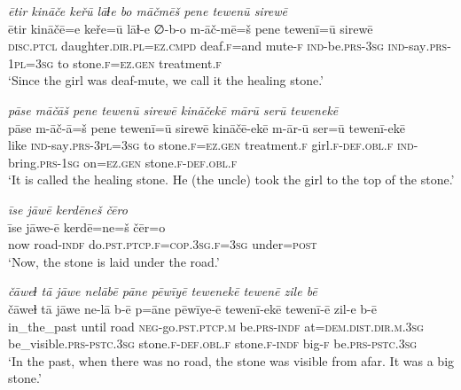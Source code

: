 \ea \label{ZP.51}
\textit{ētir kināče keřū lāɫe bo māčmēš pene tewenū sirewē} \\ 
\gll ētir kināčē=e keře=ū lāɫ-e ∅-b-o m-āč-mē=š pene tewenī=ū sirewē \\ 
 \textsc{disc.ptcl} daughter\textsc{.dir}\textsc{.pl}\textsc{=ez}\textsc{.cmpd} deaf\textsc{.f}=and mute\textsc{-f} \textsc{ind-}be\textsc{.prs}\textsc{-3sg} \textsc{ind-}say\textsc{.prs}\textsc{-1pl}\textsc{=3sg} to stone\textsc{.f}\textsc{\textsc{=ez.gen}} treatment\textsc{.f} \\ 
\glt `Since the girl was deaf-mute, we call it the healing stone.'
\z 
 
\ea \label{ZP.52}
\textit{pāse māčāš pene tewenū sirewē kināčekē mārū serū tewenekē} \\ 
\gll pāse m-āč-ā=š pene tewenī=ū sirewē kināčē-ekē m-ār-ū ser=ū tewenī-ekē \\ 
 like \textsc{ind-}say\textsc{.prs}\textsc{-3pl}\textsc{=3sg} to stone\textsc{.f}\textsc{\textsc{=ez.gen}} treatment\textsc{.f} girl\textsc{.f}\textsc{-def}\textsc{.obl}\textsc{.f} \textsc{ind-}bring\textsc{.prs}\textsc{-\textsc{1sg}} on\textsc{\textsc{=ez.gen}} stone\textsc{.f}\textsc{-def}\textsc{.obl}\textsc{.f} \\ 
\glt `It is called the healing stone. He (the uncle) took the girl to the top of the stone.'
\z 
 
\ea \label{ZP.53}
\textit{īse jāwē kerdēneš čēro} \\ 
\gll īse jāwe-ē kerdē=ne=š čēr=o \\ 
 now road\textsc{-indf} do\textsc{.pst}\textsc{.ptcp}\textsc{.f}\textsc{=cop}\textsc{.3sg}\textsc{.f}\textsc{=3sg} under\textsc{=\textsc{post}} \\ 
\glt `Now, the stone is laid under the road.'
\z 
 
\ea \label{ZP.54}
\textit{čāweɫ tā jāwe nelābē pāne pēwīyē tewenekē tewenē zile bē} \\ 
\gll čāweɫ tā jāwe ne-lā b-ē p=āne pēwīye-ē tewenī-ekē tewenī-ē zil-e b-ē \\ 
 in\_the\_past until road \textsc{neg-}go\textsc{.pst}\textsc{.ptcp}\textsc{.m} be\textsc{.prs}\textsc{-indf} at=\textsc{dem.dist}\textsc{.dir}\textsc{.m}\textsc{.3sg} be\_visible\textsc{.prs}\textsc{-pstc}\textsc{.3sg} stone\textsc{.f}\textsc{-def}\textsc{.obl}\textsc{.f} stone\textsc{.f}\textsc{-indf} big\textsc{-f} be\textsc{.prs}\textsc{-pstc}\textsc{.3sg} \\ 
\glt `In the past, when there was no road, the stone was visible from afar. It was a big stone.'
\z 
 
